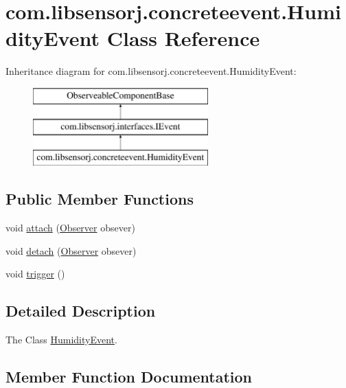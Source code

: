 \hypertarget{classcom_1_1libsensorj_1_1concreteevent_1_1HumidityEvent}{}\section{com.\+libsensorj.\+concreteevent.\+Humidity\+Event Class Reference}
\label{classcom_1_1libsensorj_1_1concreteevent_1_1HumidityEvent}
Inheritance diagram for com.\+libsensorj.\+concreteevent.\+Humidity\+Event\+:\begin{figure}[H]
\begin{center}
\leavevmode
\includegraphics[height=3.000000cm]{classcom_1_1libsensorj_1_1concreteevent_1_1HumidityEvent}
\end{center}
\end{figure}
\subsection*{Public Member Functions}
\begin{DoxyCompactItemize}
\item 
void \hyperlink{classcom_1_1libsensorj_1_1concreteevent_1_1HumidityEvent_a4ea7f94d2402aeafca55dc1fb2950d00}{attach} (\hyperlink{classcom_1_1libsensorj_1_1model_1_1Observer}{Observer} obsever)
\item 
void \hyperlink{classcom_1_1libsensorj_1_1concreteevent_1_1HumidityEvent_a577a1f99a7993ccd8019fb46c1668c9b}{detach} (\hyperlink{classcom_1_1libsensorj_1_1model_1_1Observer}{Observer} obsever)
\item 
void \hyperlink{classcom_1_1libsensorj_1_1concreteevent_1_1HumidityEvent_ad3d8c57f1934c115f0c9374394d9a601}{trigger} ()
\end{DoxyCompactItemize}


\subsection{Detailed Description}
The Class \hyperlink{classcom_1_1libsensorj_1_1concreteevent_1_1HumidityEvent}{Humidity\+Event}. 

\subsection{Member Function Documentation}
\hypertarget{classcom_1_1libsensorj_1_1concreteevent_1_1HumidityEvent_a4ea7f94d2402aeafca55dc1fb2950d00}{}
